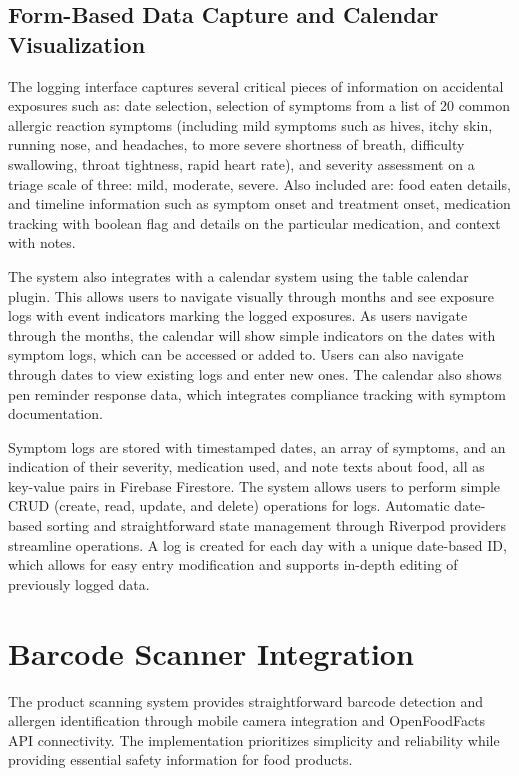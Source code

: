 \documentclass[MScCS]{uccthesis}
\begin{document}
\subsection{Form-Based Data Capture and Calendar Visualization}

The logging interface captures several critical pieces of information on accidental exposures such as: date selection, selection of symptoms from a list of 20 common allergic reaction symptoms (including mild symptoms such as hives, itchy skin, running nose, and headaches, to more severe shortness of breath, difficulty swallowing, throat tightness, rapid heart rate), and severity assessment on a triage scale of three: mild, moderate, severe. Also included are: food eaten details, and timeline information such as symptom onset and treatment onset, medication tracking with boolean flag and details on the particular medication, and context with notes.

The system also integrates with a calendar system using the table calendar plugin. This allows users to navigate visually through months and see exposure logs with event indicators marking the logged exposures. As users navigate through the months, the calendar will show simple indicators on the dates with symptom logs, which can be accessed or added to. Users can also navigate through dates to view existing logs and enter new ones. The calendar also shows pen reminder response data, which integrates compliance tracking with symptom documentation.

Symptom logs are stored with timestamped dates, an array of symptoms, and an indication of their severity, medication used, and note texts about food, all as key-value pairs in Firebase Firestore. The system allows users to perform simple CRUD (create, read, update, and delete) operations for logs. Automatic date-based sorting and straightforward state management through Riverpod providers streamline operations. A log is created for each day with a unique date-based ID, which allows for easy entry modification and supports in-depth editing of previously logged data.





\section{Barcode Scanner Integration}

The product scanning system provides straightforward barcode detection and allergen identification through mobile camera integration and OpenFoodFacts API connectivity. The implementation prioritizes simplicity and reliability while providing essential safety information for food products.
\end{document}
